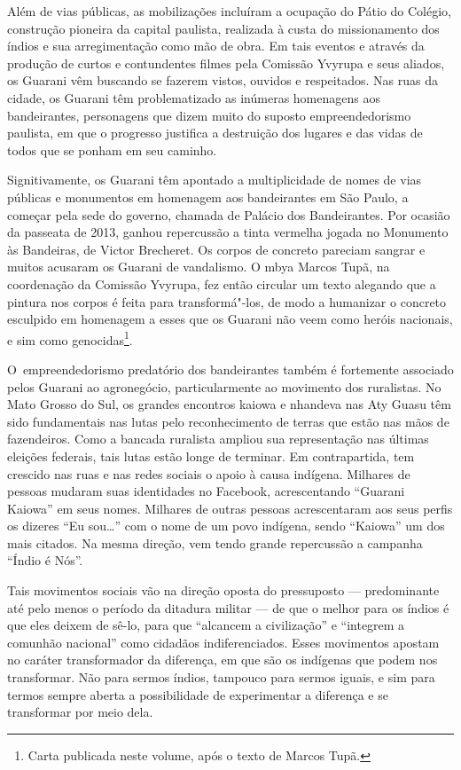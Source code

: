 Além de vias públicas, as mobilizações incluíram a ocupação do Pátio do
Colégio, construção pioneira da capital paulista, realizada à custa do
missionamento dos índios e sua arregimentação como mão de obra. Em tais
eventos e através da produção de curtos e contundentes filmes pela
Comissão Yvyrupa e seus aliados, os Guarani vêm buscando se fazerem
vistos, ouvidos e respeitados. Nas ruas da cidade, os Guarani têm
problematizado as inúmeras homenagens aos bandeirantes, personagens que
dizem muito do suposto empreendedorismo paulista, em que o progresso
justifica a destruição dos lugares e das vidas de todos que se ponham
em seu caminho.

Signitivamente, os Guarani têm apontado a multiplicidade de nomes de
vias públicas e monumentos em homenagem aos bandeirantes em São Paulo,
a começar pela sede do governo, chamada de Palácio dos Bandeirantes.
Por ocasião da passeata de 2013, ganhou repercussão a tinta vermelha
jogada no Monumento às Bandeiras, de Victor Brecheret. Os corpos de
concreto pareciam sangrar e muitos acusaram os Guarani de vandalismo. O
mbya Marcos Tupã, na coordenação da Comissão Yvyrupa, fez então
circular um texto alegando que a pintura nos corpos é feita para
transformá"-los, de modo a humanizar o concreto esculpido em homenagem a
esses que os Guarani não veem como heróis nacionais, e sim como
genocidas\footnote{Carta publicada neste volume, após o texto de
Marcos Tupã.}.

O~empreendedorismo predatório dos bandeirantes também é fortemente
associado pelos Guarani ao agronegócio, particularmente ao movimento
dos ruralistas. No Mato Grosso do Sul, os grandes encontros kaiowa e
nhandeva nas Aty Guasu têm sido fundamentais nas lutas pelo
reconhecimento de terras que estão nas mãos de fazendeiros. Como a
bancada ruralista ampliou sua representação nas últimas eleições
federais, tais lutas estão longe de terminar. Em contrapartida, tem
crescido nas ruas e nas redes sociais o apoio à causa indígena.
Milhares de pessoas mudaram suas identidades no Facebook, acrescentando
``Guarani Kaiowa'' em seus nomes. Milhares de outras pessoas
acrescentaram aos seus perfis os dizeres ``Eu sou\ldots{}'' com o nome de um
povo indígena, sendo ``Kaiowa'' um dos mais citados. Na mesma direção,
vem tendo grande repercussão a campanha ``Índio é Nós''.

Tais movimentos sociais vão na direção oposta do pressuposto ---
predominante até pelo menos o período da ditadura militar --- de que o
melhor para os índios é que eles deixem de sê-lo, para que ``alcancem a
civilização'' e ``integrem a comunhão nacional'' como cidadãos
indiferenciados. Esses movimentos apostam no caráter transformador da
diferença, em que são os indígenas que podem nos transformar. Não para
sermos índios, tampouco para sermos iguais, e sim para termos sempre
aberta a possibilidade de experimentar a diferença e se transformar por
meio dela.

